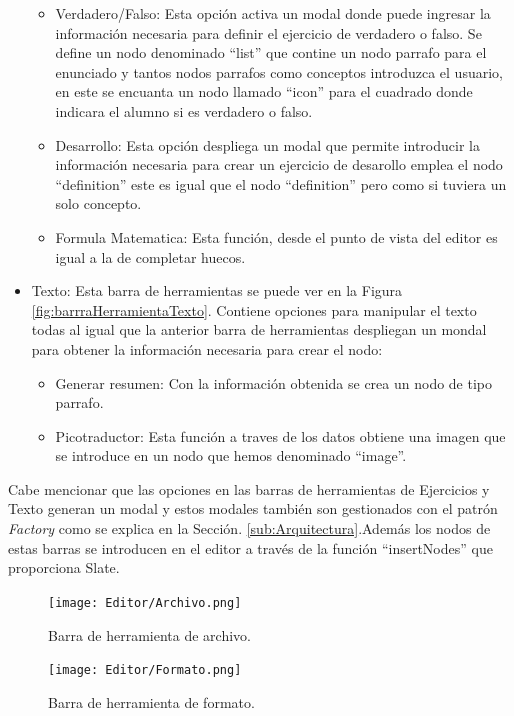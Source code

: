 \begin{itemize}
\begin{itemize}
          \item Verdadero/Falso: Esta opción activa un modal donde puede ingresar la información necesaria para definir el ejercicio de verdadero o falso. Se define un nodo denominado ``list'' que contine un nodo parrafo para el enunciado y tantos nodos parrafos como conceptos introduzca el usuario, en este se encuanta un nodo llamado ``icon'' para el cuadrado donde indicara el alumno si es verdadero o falso.
          \item Desarrollo: Esta opción despliega un modal que permite introducir la información necesaria para crear un ejercicio de desarollo emplea el nodo ``definition'' este es igual que el nodo ``definition'' pero como si tuviera un solo concepto.
          \item Formula Matematica: Esta función, desde el punto de vista del editor es igual a la de completar huecos.
        \end{itemize}
  \item Texto: Esta barra de herramientas se puede ver en la Figura \ref{fig:barrraHerramientaTexto}. Contiene opciones para manipular el texto todas al igual que la anterior barra de herramientas despliegan un mondal para obtener la información necesaria para crear el nodo:
        \begin{itemize}
          \item Generar resumen: Con la información obtenida se crea un nodo de tipo parrafo.
          \item Picotraductor: Esta función a traves de los datos obtiene una imagen que se introduce en un nodo que hemos denominado ``image''.
        \end{itemize}
\end{itemize}

Cabe mencionar que las opciones en las barras de herramientas de Ejercicios y Texto generan un modal y estos modales también son gestionados con el patrón \textit{Factory} como se explica en la Sección.  \ref{sub:Arquitectura}.Además los nodos de estas barras se introducen en el editor a través de la función ``insertNodes'' que proporciona Slate.

\begin{figure}[h!]
  \centering
  \texttt{[image: Editor/Archivo.png]}
  \caption{Barra de herramienta de archivo.}
  \label{fig:barrraHerramientaArchivo}
\end{figure}

\begin{figure}[h!]
  \centering
  \texttt{[image: Editor/Formato.png]}
  \caption{Barra de herramienta de formato.}
  \label{fig:barrraHerramientaFormato}
\end{figure}


